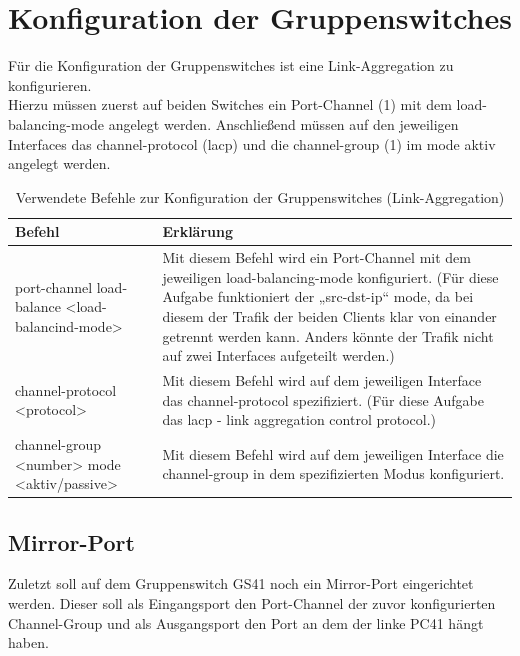 \documentclass{article}
\begin{document}
\pagebreak

\section{Konfiguration der Gruppenswitches}

Für die Konfiguration der Gruppenswitches ist eine Link-Aggregation zu konfigurieren.\\
Hierzu müssen zuerst auf beiden Switches ein Port-Channel (1) mit dem load-balancing-mode angelegt werden. Anschließend müssen auf den jeweiligen Interfaces das channel-protocol (lacp) und die channel-group (1) im mode aktiv angelegt werden.\\

\begin{table}[htbp]
    \centering
    \begin{tabularx}{\textwidth}{|X|X|}
        \toprule
        \textbf{Befehl} & \textbf{Erklärung} \\
        \midrule
        port-channel load-balance <load-balancind-mode> & Mit diesem Befehl wird ein Port-Channel mit dem jeweiligen load-balancing-mode konfiguriert. (Für diese Aufgabe funktioniert der „src-dst-ip“ mode, da bei diesem der Trafik der beiden Clients klar von einander getrennt werden kann. Anders könnte der Trafik nicht auf zwei Interfaces aufgeteilt werden.)\\
        \hline
        channel-protocol <protocol> & Mit diesem Befehl wird auf dem jeweiligen Interface das channel-protocol spezifiziert. (Für diese Aufgabe das lacp - link aggregation control protocol.)\\
        \hline
        channel-group <number> mode <aktiv/passive> & Mit diesem Befehl wird auf dem jeweiligen Interface die channel-group in dem spezifizierten Modus konfiguriert.\\
        \bottomrule
    \end{tabularx}
    \caption{Verwendete Befehle zur Konfiguration der Gruppenswitches (Link-Aggregation)}
    \label{tab:commands}
\end{table}

\subsection{Mirror-Port}

Zuletzt soll auf dem Gruppenswitch GS41 noch ein Mirror-Port eingerichtet werden. Dieser soll als Eingangsport den Port-Channel der zuvor konfigurierten Channel-Group und als Ausgangsport den Port an dem der linke PC41 hängt haben.
\end{document}
